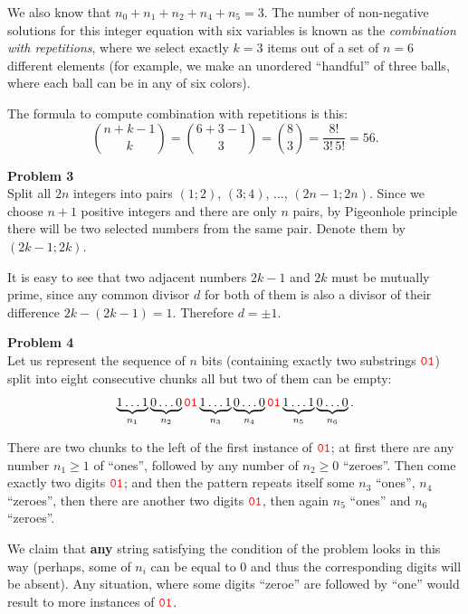 \documentclass[jou]{apa6}
\begin{document}
We also know that $n_0 + n_1 + n_2 + n_4 + n_5 = 3$. The number of non-negative solutions
for this integer equation with six variables is known as 
the {\em combination with repetitions}, where we select exactly $k=3$ items out of a
set of $n=6$ different elements (for example, we make an unordered ``handful'' of three balls, 
where each ball can be in  any of six colors). 

The formula to compute combination with repetitions is this:
$${n+k-1 \choose k} = {6+3-1 \choose 3} = {8 \choose 3} = \frac{8!}{3!\,5!} = 56.$$

\vspace{10pt}
{\bf Problem 3}\\
Split all $2n$ integers into pairs $(1;2)$, $(3;4)$, $\ldots$, $(2n-1;2n)$. 
Since we  choose $n+1$ positive integers and there are  only $n$ pairs, 
by Pigeonhole principle there will be two selected numbers from the same
pair. Denote them by $(2k-1;2k)$. 

It is easy to see that two adjacent numbers $2k-1$ and $2k$ must be 
mutually prime, since any common divisor $d$ for both of them 
is also a divisor of their difference $2k - (2k-1) = 1$. 
Therefore $d = \pm 1$. 


\vspace{10pt}
{\bf Problem 4}\\
Let us represent the sequence of $n$ bits (containing exactly two 
substrings $\textcolor{red}{\mathtt{01}}$) split into eight consecutive chunks \textendash{}
all but two of them can be empty: 
$$\underbrace{1\ldots{}1}_{n_1}\underbrace{0\ldots{}0}_{n_2}\textcolor{red}{\mathtt{01}}
\underbrace{1\ldots{}1}_{n_3}\underbrace{0\ldots{}0}_{n_4}\textcolor{red}{\mathtt{01}}
\underbrace{1\ldots{}1}_{n_5}\underbrace{0\ldots{}0}_{n_6}.$$

There are two chunks to the left of the first instance of $\textcolor{red}{\mathtt{01}}$; 
at first there are any number $n_1\geq 1$ of ``ones'', followed by any number of 
$n_2 \geq 0$ ``zeroes''. Then come exactly two digits $\textcolor{red}{\mathtt{01}}$; and then 
the pattern repeats itself \textendash{} some $n_3$ ``ones'', $n_4$ ``zeroes'', 
then there are another two digits $\textcolor{red}{\mathtt{01}}$, then again 
$n_5$ ``ones'' and $n_6$ ``zeroes''.

We claim that {\bf any} string satisfying the condition of the problem looks 
in this way (perhaps, some of $n_i$ can be equal to $0$ and thus the corresponding digits will be absent).
Any situation, where some digits ``zeroe'' are followed by ``one'' would result to 
more instances of $\textcolor{red}{\mathtt{01}}$. 
\end{document}
